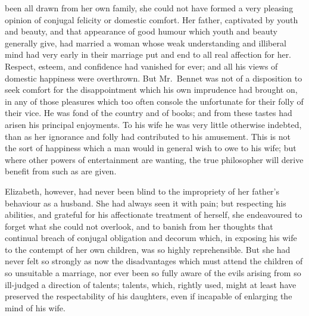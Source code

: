  been all drawn from her own family,
she could not have formed a very pleasing opinion of conjugal
felicity or domestic comfort.  Her father, captivated by youth
and beauty, and that appearance of good humour which youth
and beauty generally give, had married a woman whose weak
understanding and illiberal mind had very early in their marriage
put and end to all real affection for her.  Respect, esteem, and
confidence had vanished for ever; and all his views of domestic
happiness were overthrown.  But Mr.\ Bennet was not of a
disposition to seek comfort for the disappointment which his
own imprudence had brought on, in any of those pleasures which
too often console the unfortunate for their folly of their vice.
He was fond of the country and of books; and from these tastes had
arisen his principal enjoyments.  To his wife he was very little
otherwise indebted, than as her ignorance and folly had
contributed to his amusement.  This is not the sort of happiness
which a man would in general wish to owe to his wife; but
where other powers of entertainment are wanting, the true
philosopher will derive benefit from such as are given.

Elizabeth, however, had never been blind to the impropriety of
her father's behaviour as a husband.  She had always seen it with
pain; but respecting his abilities, and grateful for his affectionate
treatment of herself, she endeavoured to forget what she could
not overlook, and to banish from her thoughts that continual
breach of conjugal obligation and decorum which, in exposing
his wife to the contempt of her own children, was so highly
reprehensible.  But she had never felt so strongly as now the
disadvantages which must attend the children of so unsuitable a
marriage, nor ever been so fully aware of the evils arising from
so ill-judged a direction of talents; talents, which, rightly used,
might at least have preserved the respectability of his daughters,
even if incapable of enlarging the mind of his wife.

